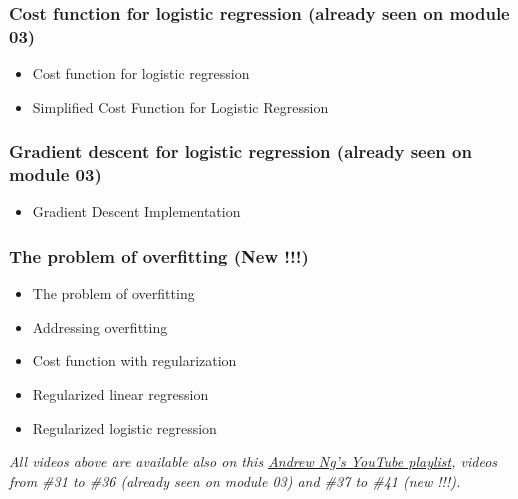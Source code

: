 \subsubsection*{Cost function for logistic regression (already seen on module 03)}
\begin{itemize}
  \item Cost function for logistic regression
  \item Simplified Cost Function for Logistic Regression
\end{itemize}

\subsubsection*{Gradient descent for logistic regression (already seen on module 03)}
\begin{itemize}
  \item Gradient Descent Implementation
\end{itemize}

\subsubsection*{The problem of overfitting (New !!!)}
\begin{itemize}
  \item The problem of overfitting
  \item Addressing overfitting
  \item Cost function with regularization
  \item Regularized linear regression
  \item Regularized logistic regression  
\end{itemize}


\emph{All videos above are available also on this \href{https://youtube.com/playlist?list=PLkDaE6sCZn6FNC6YRfRQc_FbeQrF8BwGI&feature=shared}{Andrew Ng's YouTube playlist}, videos from \#31 to \#36 (already seen on module 03) and \#37 to \#41 (new !!!).}